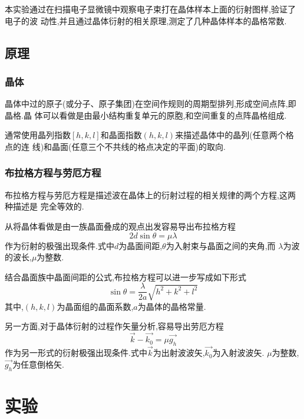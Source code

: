 \documentclass[aps,pre,12pt,preprint,onecolumn,showpacs,showkeys]{revtex4-1}
\begin{document}
本实验通过在扫描电子显微镜中观察电子束打在晶体样本上面的衍射图样,验证了电子的波
动性,并且通过晶体衍射的相关原理,测定了几种晶体样本的晶格常数.
 
\subsection{原理}

\subsubsection{晶体}

晶体中过的原子(或分子、原子集团)在空间作规则的周期型排列,形成空间点阵,即晶格.晶
体可以看做是由最小结构重复单元的原胞,和空间重复的点阵晶格组成.

通常使用晶列指数$[h,k,l]$和晶面指数$(h,k,l)$来描述晶体中的晶列(任意两个格点的连
线)和晶面(任意三个不共线的格点决定的平面)的取向.

\subsubsection{布拉格方程与劳厄方程}

布拉格方程与劳厄方程是描述波在晶体上的衍射过程的相关规律的两个方程,这两种描述是
完全等效的.

从将晶体看做是由一族晶面叠成的观点出发容易导出布拉格方程
\begin{equation}
    \label{eq:be}
    2d\sin{\theta} = \mu\lambda
\end{equation}
作为衍射的极强出现条件.式中$d$为晶面间距,$\theta$为入射束与晶面之间的夹角,而
$\lambda$为波的波长,$\mu$为整数.

结合晶面族中晶面间距的公式,布拉格方程可以进一步写成如下形式
\begin{equation}
    \label{eq:be2}
    \sin{\theta} = \frac{\lambda}{2a}\sqrt{h^2 + k^2 + l^2}
\end{equation}
其中,$(h,k,l)$为晶面组的晶面系数,$a$为晶体的晶格常量.

另一方面,对于晶体衍射的过程作矢量分析,容易导出劳厄方程
\begin{equation}
\label{eq:le}
\vec{k} - \vec{k_0} = \mu\vec{g_h}
\end{equation}
作为另一形式的衍射极强出现条件.式中$\vec{k}$为出射波波矢,$\vec{k_0}$为入射波波矢.
$\mu$为整数,$\vec{g_h}$为任意倒格矢.

\section{实验}
\end{document}
